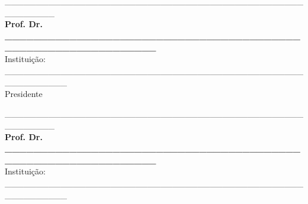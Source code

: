 \documentclass[
	12pt,				%
	oneside,			%
	a4paper,			%
	english,			%
	brazil				%
	]{abntex2ppgsi}
\begin{document}
\begin{folhadeaprovacao}
\begin{center}
%
% 
% 
% 
% 
% 
%
%
%
\_\_\_\_\_\_\_\_\_\_\_\_\_\_\_\_\_\_\_\_\_\_\_\_\_\_\_\_\_\_\_\_\_\_\_\_\_\_\_\_\_\_\_\_\_\_\_\_\_\_\_\_\_\_\_\_
\vspace*{0.2cm} 
\\ \textbf{Prof. Dr. \_\_\_\_\_\_\_\_\_\_\_\_\_\_\_\_\_\_\_\_\_\_\_\_\_\_\_\_\_\_\_\_\_\_\_\_\_\_\_\_\_\_\_\_\_\_\_\_\_\_\_\_\_\_\_\_\_\_\_\_\_\_} 
\\ \vspace*{0.2cm} 
Instituição: \_\_\_\_\_\_\_\_\_\_\_\_\_\_\_\_\_\_\_\_\_\_\_\_\_\_\_\_\_\_\_\_\_\_\_\_\_\_\_\_\_\_\_\_\_\_\_\_\_\_\_\_\_\_\_\_\_\_ 
\\ \vspace*{0.2cm}
Presidente 

\vspace*{2cm}

\_\_\_\_\_\_\_\_\_\_\_\_\_\_\_\_\_\_\_\_\_\_\_\_\_\_\_\_\_\_\_\_\_\_\_\_\_\_\_\_\_\_\_\_\_\_\_\_\_\_\_\_\_\_\_\_
\vspace*{0.2cm} 
\\ \textbf{Prof. Dr. \_\_\_\_\_\_\_\_\_\_\_\_\_\_\_\_\_\_\_\_\_\_\_\_\_\_\_\_\_\_\_\_\_\_\_\_\_\_\_\_\_\_\_\_\_\_\_\_\_\_\_\_\_\_\_\_\_\_\_\_\_\_} 
\\ \vspace*{0.2cm} 
Instituição: \_\_\_\_\_\_\_\_\_\_\_\_\_\_\_\_\_\_\_\_\_\_\_\_\_\_\_\_\_\_\_\_\_\_\_\_\_\_\_\_\_\_\_\_\_\_\_\_\_\_\_\_\_\_\_\_\_\_


\end{center}
\end{folhadeaprovacao}
\end{document}
